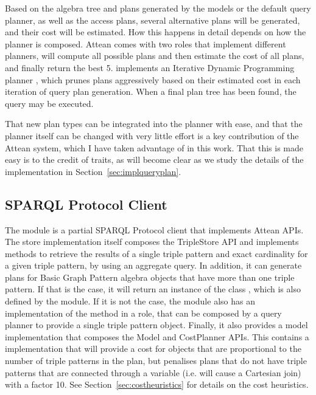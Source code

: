 Based on the algebra tree and plans generated by the models or the
default query planner, as well as the access plans, several
alternative plans will be generated, and their cost will be
estimated. How this happens in detail depends on how the planner is
composed. Attean comes with two roles that implement different
planners,  will compute all
possible plans and then estimate the cost of all plans, and finally
return the best 5. 
implements an Iterative Dynamic Programming planner
\cite{Kossmann:2000:IDP:352958.352982}, which prunes plans
aggressively based on their estimated cost in each iteration of query
plan generation. When a final plan tree has been found, the query may
be executed. 

That new plan types can be integrated into the planner with ease, and
that the planner itself can be changed with very little effort is a
key contribution of the Attean system, which I have taken advantage of
in this work. That this is made easy is to the credit of traits, as
will become clear as we study the details of the implementation in
Section~\ref{sec:implqueryplan}.


\subsection{SPARQL Protocol Client}\label{sec:sparqlclient}

The  module is a partial SPARQL
Protocol client that implements Attean APIs. The store implementation
itself composes the TripleStore API and implements methods to retrieve
the results of a single triple pattern and exact cardinality for a
given triple pattern, by using an aggregate query. In addition, it can
generate plans for Basic Graph Pattern algebra objects that have more
than one triple pattern. If that is the case, it will return an
instance of the class , which is
also defined by the module. If it is not the case, the module also has
an implementation of the  method in a
 role, that can be
composed by a query planner to provide a single triple pattern
 object. Finally, it also provides a
model implementation that composes the Model and CostPlanner
APIs. This contains a  implementation that will
provide a cost for  objects that are
proportional to the number of triple patterns in the plan, but
penalises plans that do not have triple patterns that are connected
through a variable (i.e. will cause a Cartesian join) with a factor
10. See Section~\ref{sec:costheuristics} for details on the cost
heuristics.

